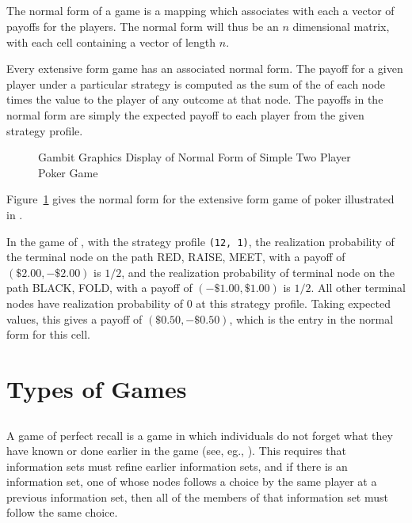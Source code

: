 \documentclass[12pt]{report}
\begin{document}
\subsection{}\label{normformsec}
The normal form of a game is a mapping which associates with 
each  a vector of
 payoffs for the players.  The normal form will thus be an $n$ dimensional 
matrix, with each cell containing a vector of length $n$.

Every extensive form game has an associated normal form.  The payoff for 
a given player under a particular strategy is computed as the sum of the 
 of each node times the 
value to the player of any outcome at that node.  The payoffs in the normal 
form are simply the expected payoff to each player from the given strategy
 profile.  

\begin{figure}
\caption{Gambit Graphics Display of Normal Form of
		Simple Two Player Poker Game}\label{fig_samp2}
\end{figure}

Figure~\ref{fig_samp2} gives the normal form for the extensive form game 
of poker illustrated in 
. 

In the game of  , with the 
strategy profile {\tt (12, 1)}, the realization probability of the terminal 
node on the path RED, RAISE, MEET, with a payoff of $(\$2.00, -\$2.00)$ 
is $1/2$, and the realization probability of terminal node on the path 
BLACK, FOLD, with a payoff of  $(-\$1.00, \$1.00)$ is $1/2$.    All other 
terminal nodes have realization probability of $0$ at this strategy profile.  
Taking expected values, this gives a payoff of  
$(\$0.50, -\$0.50)$, which is the entry in the normal form for this cell.  

\section{Types of Games}
\subsection{}\label{perfrecallsec}
A game of perfect recall is a game in which individuals do not forget what
they have known or done earlier in the game (see, eg., \cite{Mye:91}).  
This requires that
information sets must refine earlier information sets, and if there is
an information set, one of whose nodes follows a choice by the same player
at a previous information set, then all of the members of that information
set must follow the same choice.
\end{document}
